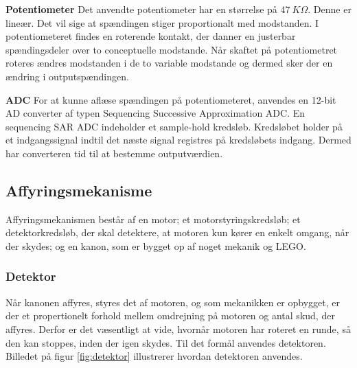 \noindent \textbf{Potentiometer} \newline
Det anvendte potentiometer har en størrelse på 47\(\ K\Omega\). Denne er lineær. Det vil sige at spændingen stiger proportionalt med modstanden. I potentiometeret findes en roterende kontakt, der danner en justerbar spændingsdeler over to conceptuelle modstande. Når skaftet på potentiometret roteres ændres modstanden i de to variable modstande og dermed sker der en ændring i outputspændingen. \newline

\noindent \textbf{ADC} \newline
For at kunne aflæse spændingen på potentiometeret, anvendes en 12-bit AD converter af typen Sequencing Successive Approximation ADC. En sequencing SAR ADC indeholder et sample-hold kredsløb. Kredsløbet holder på et indgangssignal indtil det næste signal registres på kredsløbets indgang. Dermed har converteren tid til at bestemme outputværdien.


\subsection{Affyringsmekanisme}
Affyringsmekanismen består af en motor; et motorstyringskredsløb; et detektorkredsløb, der skal detektere, at motoren kun kører en enkelt omgang, når der skydes; og en kanon, som er bygget op af noget mekanik og LEGO. 

\subsubsection{Detektor}
Når kanonen affyres, styres det af motoren, og som mekanikken er opbygget, er der et propertionelt forhold mellem omdrejning på motoren og antal skud, der affyres. Derfor er det væsentligt at vide, hvornår motoren har roteret en runde, så den kan stoppes, inden der igen skydes. Til det formål anvendes detektoren. Billedet på figur \ref{fig:detektor} illustrerer hvordan detektoren anvendes.

